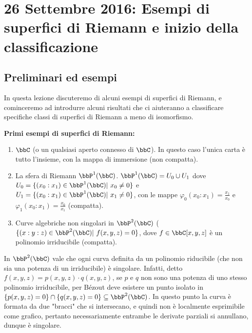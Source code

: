 \chapter{26 Settembre 2016: Esempi di superfici di Riemann e inizio della classificazione}

\section{Preliminari ed esempi}
In questa lezione discuteremo di alcuni esempi di superfici di Riemann, e cominceremo ad introdurre alcuni risultati che ci aiuteranno a classificare specifiche classi di superfici di Riemann a meno di isomorfismo.



\textbf{Primi esempi di superfici di Riemann:}
\begin{enumerate}
  \item $\bbC$ (o un qualsiasi aperto connesso di $\bbC$). In questo caso l'unica carta è tutto l'insieme, con la mappa di immersione (non compatta).
  \item La sfera di Riemann $\bbP^1(\bbC)$. $\bbP^1(\bbC)=U_0\cup U_1$ dove $U_0=\{(x_0:x_1)\in \bbP^1(\bbC) | \ x_0\neq 0\}$ e $U_1=\{(x_0:x_1)\in \bbP^1(\bbC) | \ x_1\neq 0\}$, con le mappe $\varphi_0(x_0:x_1)=\frac{x_1}{x_0}$ e $\varphi_1(x_0:x_1)=\frac{x_0}{x_1}$ (compatta).
  \item Curve algebriche non singolari in $\bbP^2(\bbC)$ ($\{(x:y:z)\in \bbP^2(\bbC) | \ f(x,y,z)=0\}$, dove $f\in \bbC[x,y,z]$ è un polinomio irriducibile (compatta). %
\end{enumerate}
\begin{osservazione}
    In $\bbP^2(\bbC)$ vale che ogni curva definita da un polinomio riducibile (che non sia una potenza di un irriducibile) è singolare. Infatti, detto $f(x,y,z)=p(x,y,z)\cdot q(x,y,z)$, se $p$ e $q$ non sono una potenza di uno stesso polinomio irriducibile, per Bézout deve esistere un punto isolato in $\{p(x,y,z)=0\}\cap\{q(x,y,z)=0\}\subseteq \bbP^2(\bbC)$. In questo punto la curva è formata da due "bracci" che si intersecano, e quindi non è localmente esprimibile come grafico, pertanto necessariamente entrambe le derivate parziali si annullano, dunque è singolare. %
\end{osservazione}

